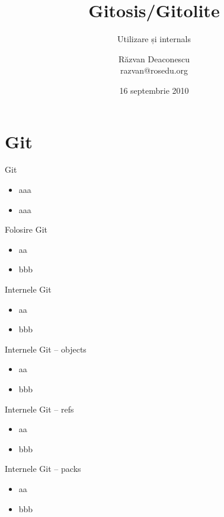 \documentclass{simple}
\title[Gitosis/Gitolite]{Gitosis/Gitolite}
\subtitle{Utilizare și internals}
\institute{Întâlnirile lunare RLUG -- Septembrie 2010}
\author[Răzvan Deaconescu]{Răzvan Deaconescu\\
	razvan@rosedu.org}
\date{16 septembrie 2010}
\begin{document}
\frame{\titlepage}

\frame{\tableofcontents}

\section{Git}

\begin{frame}{Git}
	\begin{itemize}		%
		\item aaa
		\item aaa
	\end{itemize}
\end{frame}

\begin{frame}{Folosire Git}
	\begin{itemize}
		\item aa
		\item bbb
	\end{itemize}
\end{frame}

\begin{frame}{Internele Git}
	\begin{itemize}
		\item aa
		\item bbb
	\end{itemize}
\end{frame}

\begin{frame}{Internele Git -- objects}
	\begin{itemize}
		\item aa
		\item bbb
	\end{itemize}
\end{frame}

\begin{frame}{Internele Git -- refs}
	\begin{itemize}
		\item aa
		\item bbb
	\end{itemize}
\end{frame}

\begin{frame}{Internele Git -- packs}
	\begin{itemize}
		\item aa
		\item bbb
	\end{itemize}
\end{frame}
\end{document}
